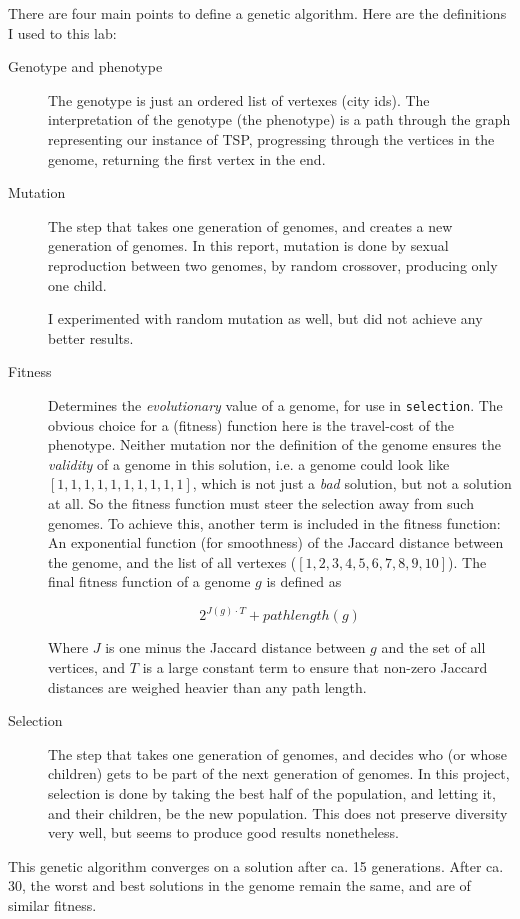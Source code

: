\documentclass[a4paper, titlepage]{report}
\renewcommand{\%}{\scalebox{.9}{\oldpct}}
\begin{document}
There are four main points to define a genetic algorithm. Here are the
definitions I used to this lab:
\begin{description}
\item[Genotype and phenotype]
The genotype is just an ordered list of vertexes (city ids).
The interpretation of the genotype (the phenotype) is a path through the graph
representing our instance of TSP, progressing through the vertices in the
genome, returning the first vertex in the end.

\item[Mutation]
The step that takes one generation of genomes, and creates a
new generation of genomes. In this report, mutation is done by sexual
reproduction between two genomes, by random crossover, producing only one child.

I experimented with random mutation as well, but did
not achieve any better results.

\item[Fitness]
Determines the \textit{evolutionary} value of a genome, for use in
\texttt{selection}. The obvious choice for a (fitness) function here is the
travel-cost of the phenotype. Neither mutation nor the definition of the genome
ensures the \textit{validity} of a genome in this solution, i.e. a genome could
look like $\left[1,1,1,1,1,1,1,1,1,1\right]$, which is not just a \textit{bad}
solution, but not a solution at all. So the fitness function must steer the
selection away from such genomes. To achieve this, another term is included in
the fitness function: An exponential function (for smoothness) of the Jaccard
distance between the genome, and the list of all vertexes
($\left[1,2,3,4,5,6,7,8,9,10\right]$). 
The final fitness function of a genome $g$ is defined as

	$$2^{J(g) \cdot T} + pathlength(g)$$

Where $J$ is one minus the Jaccard distance between $g$ and the set of all
vertices, and $T$ is a large constant term to ensure that non-zero Jaccard
distances are weighed heavier than any path length.

\item[Selection]
The step that takes one generation of genomes, and decides who (or whose children)
gets to be part of the next generation of genomes.
In this project, selection is done by taking the best half of the population, and
letting it, and their children, be the new population.
This does not preserve diversity very well, but seems to produce good results
nonetheless.
\end{description}

This genetic algorithm converges on a solution after ca. 15 generations. After ca. 30, the worst and best solutions in the genome remain the same, and are of similar fitness.
\end{document}
